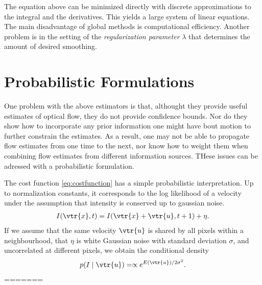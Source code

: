 \begin{compactdesc}
The equation above can be minimized directly with discrete approximations to the integral and the derivatives. This yields a large system of linear equations. The main disadvantage of global methods is computational efficiency. Another problem is in the setting of the \emph{regularization parameter} $\lambda$ that determines the amount of desired smoothing.
\section{Probabilistic Formulations}
One problem with the above estimators is that, althought they provide useful estimates of optical flow, they do not provide confidence bounds. Nor do they show how to incorporate any prior information one might have bout motion to further constrain the estimates. As a result, one may not be able to propagate flow estimates from one time to the next, nor know how to weight them when combining flow estimates from different information sources. THese issues can be adressed with a probabilistic formulation.

The cost function \ref{eq:costfunction} has a simple probabilistic interpretation. Up to normalization constants, it corresponds to the log likelihood of a velocity under the assumption that intensity is conserved up to gaussian noise. 
\begin{gather*}
	I(\vtr{x},t)=I(\vtr{x}+\vtr{u},t+1)+\eta.
\end{gather*}
If we assume that the same velocity $\vtr{u}$ is shared by all pixels within a neighbourhood, that $\eta$ is white Gaussian noise with standard deviation $\sigma$, and uncorrelated at different pixels, we obtain the conditional density
\begin{gather*}
	p(I\mid \vtr{u})=\propto e^{E(\vtr{u})/2\sigma^2}.
\end{gather*}
=======

\end{compactdesc}
